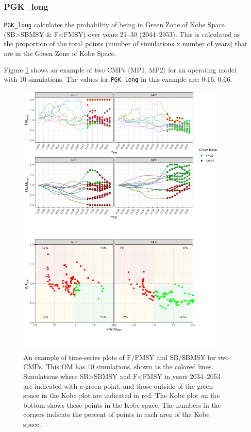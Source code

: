 \documentclass[
]{article}
\begin{document}
\hypertarget{pgk_long}{%
\subsubsection{PGK\_long}\label{pgk_long}}

\texttt{PGK\_long} calculates the probability of being in Green Zone of Kobe Space (SB\textgreater SBMSY \& F\textless FMSY) over years 21--30 (2044--2053). This is calculated as the proportion of the total points (number of simulations x number of years) that are in the Green Zone of Kobe Space.

Figure \ref{fig:PGKlong} shows an example of two CMPs (MP1, MP2) for an operating model with 10 simulations. The values for \texttt{PGK\_long} in this example are: 0.16, 0.66.

\begin{figure}
\includegraphics[width=400px]{../../img/PMs/PGK_long} \caption{An example of time-series plots of F/FMSY and SB/SBMSY for two CMPs. This OM has 10 simulations, shown as the colored lines. Simulations where SB>SBMSY and F<FMSY in years 2034--2053 are indicated with a green point, and those outside of the green space in the Kobe plot are indicated in red. The Kobe plot on the bottom shows these points in the Kobe space. The numbers in the corners indicate the percent of points in each area of the Kobe space.}\label{fig:PGKlong}
\end{figure}
\end{document}
